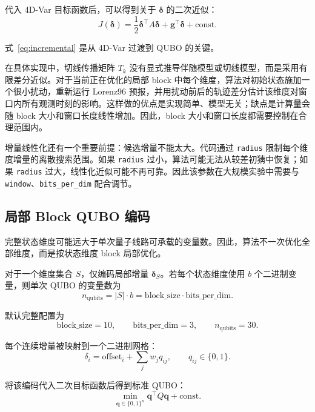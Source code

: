 \documentclass[UTF8,a4paper,12pt]{ctexart}
\begin{document}
代入 4D-Var 目标函数后，可以得到关于 $\bm{\delta}$ 的二次近似：
\begin{equation}
  J(\bm{\delta})
  =
  \frac{1}{2}
  \bm{\delta}^{\top} A \bm{\delta}
  +
  \bm{g}^{\top}\bm{\delta}
  + \mathrm{const}.
  \label{eq:incremental}
\end{equation}

式~\eqref{eq:incremental} 是从 4D-Var 过渡到 QUBO 的关键。

在具体实现中，切线传播矩阵 $T_k$ 没有显式推导伴随模型或切线模型，而是采用有限差分近似。对于当前正在优化的局部 block 中每个维度，算法对初始状态施加一个很小扰动，重新运行 Lorenz96 预报，并用扰动前后的轨迹差分估计该维度对窗口内所有观测时刻的影响。这样做的优点是实现简单、模型无关；缺点是计算量会随 block 大小和窗口长度线性增加。因此，block 大小和窗口长度都需要控制在合理范围内。

增量线性化还有一个重要前提：候选增量不能太大。代码通过 \texttt{radius} 限制每个维度增量的离散搜索范围。如果 \texttt{radius} 过小，算法可能无法从较差初猜中恢复；如果 \texttt{radius} 过大，线性化近似可能不再可靠。因此该参数在大规模实验中需要与 \texttt{window}、\texttt{bits\_per\_dim} 配合调节。

\subsection{局部 Block QUBO 编码}

完整状态维度可能远大于单次量子线路可承载的变量数。因此，算法不一次优化全部维度，而是按状态维度 block 局部优化。

对于一个维度集合 $S$，仅编码局部增量 $\bm{\delta}_S$。若每个状态维度使用 $b$ 个二进制变量，则单次 QUBO 的变量数为
\begin{equation}
  n_{\mathrm{qubits}} = |S| \cdot b
  =
  \mathrm{block\_size} \cdot \mathrm{bits\_per\_dim}.
\end{equation}

默认完整配置为
\begin{equation}
  \mathrm{block\_size}=10,
  \qquad
  \mathrm{bits\_per\_dim}=3,
  \qquad
  n_{\mathrm{qubits}}=30.
\end{equation}

每个连续增量被映射到一个二进制网格：
\begin{equation}
  \delta_i
  =
  \mathrm{offset}_i
  +
  \sum_j w_j q_{ij},
  \qquad
  q_{ij} \in \{0,1\}.
\end{equation}

将该编码代入二次目标函数后得到标准 QUBO：
\begin{equation}
  \min_{\bm{q} \in \{0,1\}^n}
  \bm{q}^{\top} Q \bm{q} + \mathrm{const}.
  \label{eq:qubo}
\end{equation}
\end{document}
